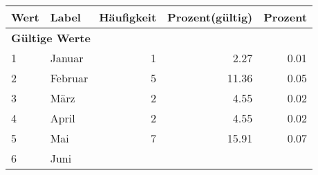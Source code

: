      \begin{longtable}{lXrrr}
     \toprule
     \textbf{Wert} & \textbf{Label} & \textbf{Häufigkeit} & \textbf{Prozent(gültig)} & \textbf{Prozent} \\
     \endhead
     \midrule
     \multicolumn{5}{l}{\textbf{Gültige Werte}}\\

     1 &
     \multicolumn{1}{X}{ Januar   } &


       \num{1} &
       \num[round-mode=places,round-precision=2]{2.27} &
         \num[round-mode=places,round-precision=2]{0.01} \\

     2 &
     \multicolumn{1}{X}{ Februar   } &


       \num{5} &
       \num[round-mode=places,round-precision=2]{11.36} &
         \num[round-mode=places,round-precision=2]{0.05} \\

     3 &
     \multicolumn{1}{X}{ März   } &


       \num{2} &
       \num[round-mode=places,round-precision=2]{4.55} &
         \num[round-mode=places,round-precision=2]{0.02} \\

     4 &
     \multicolumn{1}{X}{ April   } &


       \num{2} &
       \num[round-mode=places,round-precision=2]{4.55} &
         \num[round-mode=places,round-precision=2]{0.02} \\

     5 &
     \multicolumn{1}{X}{ Mai   } &


       \num{7} &
       \num[round-mode=places,round-precision=2]{15.91} &
         \num[round-mode=places,round-precision=2]{0.07} \\

     6 &
     \multicolumn{1}{X}{ Juni   } &



\end{longtable}
